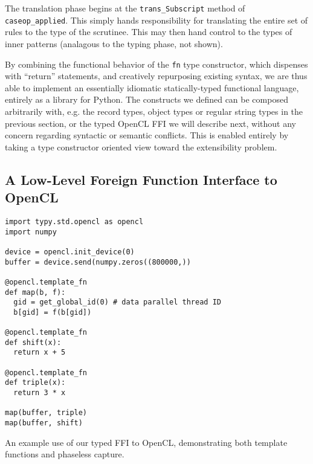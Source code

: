 \documentclass[preprint,10pt]{sigplanconf}
\newcommand{\lip}[1]{\lstinline[language=Python,basicstyle=\ttfamily\small,deletendkeywords={tuple,buffer,map}]{#1}}
\begin{document}
The translation phase begins at the \lip{trans_Subscript} method of \lip{caseop_applied}. This simply hands responsibility for translating the entire set of rules to the type of the scrutinee. This may then hand control to the types of inner patterns (analagous to the typing phase, not shown). 

By combining the functional behavior of the \lip{fn} type constructor, which dispenses with ``return'' statements, and creatively repurposing existing syntax, we are thus able to implement an essentially idiomatic statically-typed functional language, entirely as a library for Python. The constructs we defined can be composed arbitrarily with, e.g. the record types, object types or regular string types in the previous section, or the typed OpenCL FFI we will describe next, without any concern regarding syntactic or semantic conflicts. This is enabled entirely by taking a type constructor oriented view toward the extensibility problem. 

\subsection{A Low-Level Foreign Function Interface to OpenCL} 

\begin{codelisting}[t]
\begin{lstlisting}
import typy.std.opencl as opencl
import numpy

device = opencl.init_device(0)
buffer = device.send(numpy.zeros((800000,))

@opencl.template_fn
def map(b, f):
  gid = get_global_id(0) # data parallel thread ID
  b[gid] = f(b[gid])

@opencl.template_fn
def shift(x):
  return x + 5

@opencl.template_fn
def triple(x):
  return 3 * x

map(buffer, triple)
map(buffer, shift)
\end{lstlisting}
\caption{An example use of our typed FFI to OpenCL, demonstrating both template functions and phaseless capture.}
\label{example-opencl}
\end{codelisting}
\end{document}
